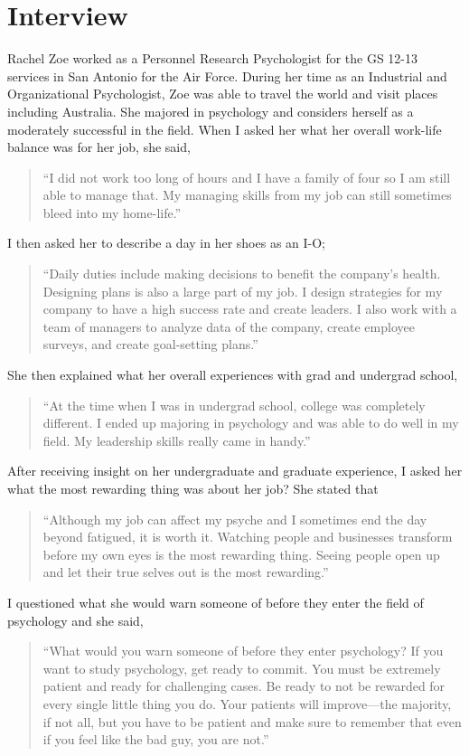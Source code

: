 \section{Interview}
    Rachel Zoe worked as a Personnel Research Psychologist for the GS 12-13 services in San Antonio for the Air Force. During her time as an Industrial and Organizational Psychologist, Zoe was able to travel the world and visit places including Australia. She majored in psychology and considers herself as a moderately successful in the field. When I asked her what her overall work-life balance was for her job, she said,
    \begin{quote}
        “I did not work too long of hours and I have a family of four so I am still able to manage  that. My managing skills from my job can still sometimes bleed into my home-life.”
    \end{quote}
    I then asked her to describe a day in her shoes as an I-O; 
    \begin{quote}
        “Daily duties include making decisions to benefit the company’s health. Designing plans  is also a large part of my job. I design strategies for my company to have a high success  rate and create leaders. I also work with a team of managers to analyze data of the company, create employee surveys, and create goal-setting plans.”
    \end{quote}
    She then explained what her overall experiences with grad and undergrad school,  
    \begin{quote}
        “At the time when I was in undergrad school, college was completely different. I ended  up majoring in psychology and was able to do well in my field. My leadership skills really came in handy.”
    \end{quote}
    After receiving insight on her undergraduate and graduate experience, I asked her what the most rewarding thing was about her job? She stated that 
    \begin{quote}
        “Although my job can affect my psyche and I sometimes end the day beyond fatigued, it   is worth it. Watching people and businesses transform before my own eyes is the most rewarding thing. Seeing people open up and let their true selves out is the most rewarding.” 
    \end{quote}
    I questioned what she would warn someone of before they enter the field of psychology and she said, 
    \begin{quote}
        “What would you warn someone of before they enter psychology? If you want to study   psychology, get ready to commit. You must be extremely patient and ready for challenging cases. Be ready to not be rewarded for every single little thing you do. Your patients will improve—the majority, if not all, but you have to be patient and make sure to remember that even if you feel like the bad guy, you are not.”
    \end{quote}

